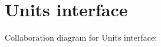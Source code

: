 \hypertarget{group__units__interface}{}\section{Units interface}
\label{group__units__interface}
Collaboration diagram for Units interface\+:
